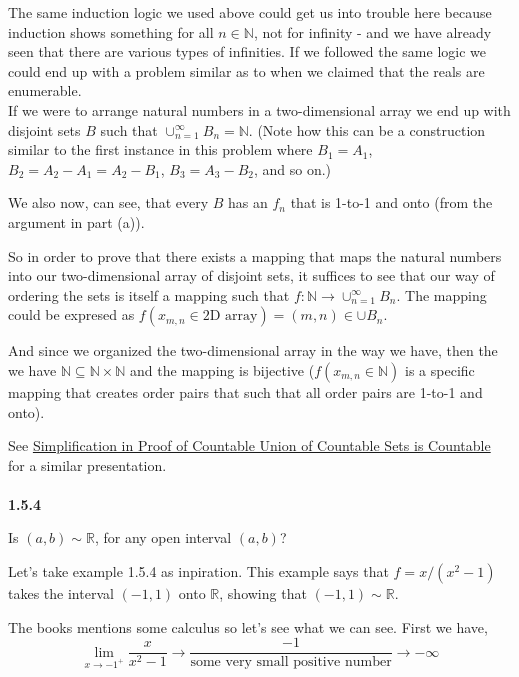 The same induction logic we used above could get us into trouble here because induction shows something
for all $n \in \mathbb{N}$, not for infinity - and we have already seen that there are various types of infinities.
If we followed the same logic we could end up with a problem similar as to when we claimed that the reals are
enumerable.
\\

If we were to arrange natural numbers in a two-dimensional array we end up with disjoint sets $B$ such that
$\cup^{\infty}_{n=1} B_n = \mathbb{N}$.
(Note how this can be a construction similar to the first instance in this problem where $B_1 = A_1$,
$B_2 = A_2-A_1 = A_2 - B_1$, $B_3 = A_3 - B_2$, and so on.)

We also now, can see, that every $B$ has an $f_n$ that is 1-to-1 and onto (from the argument in part (a)).

So in order to prove that there exists a mapping that maps the natural numbers into our two-dimensional array of disjoint sets,
it suffices to see that our way of ordering the sets is itself a mapping such that
$f : \mathbb{N} \rightarrow \cup^{\infty}_{n=1} B_n$.
The mapping could be expresed as $f (x_{m,n} \in \text{2D array}) = (m, n) \in \cup B_n$.

And since we organized the two-dimensional array in the way we have, then the we have
$\mathbb{N} \subseteq \mathbb{N} \times \mathbb{N}$ and the mapping is bijective
($f (x_{m,n} \in \mathbb{N})$ is a specific mapping that creates order pairs that such that all order pairs are 1-to-1 and onto).

See
\href{https://math.stackexchange.com/questions/4403048/simplification-in-proof-of-countable-union-of-countable-sets-is-countable}{Simplification in Proof of Countable Union of Countable Sets is Countable}
for a similar presentation.
\\~\\



\textbf{1.5.4}

Is $(a,b) \sim \mathbb{R}$, for any open interval $(a,b)$?

Let's take example 1.5.4 as inpiration.
This example says that $f = x / (x^2 -1)$ takes the interval $(-1, 1)$ onto $\mathbb{R}$, showing that
$(-1,1) \sim \mathbb{R}$.

The books mentions some calculus so let's see what we can see.
First we have,
$$
\lim_{x \rightarrow -1^+ } \frac{x}{x^2 - 1} \rightarrow
    \frac{-1}{\text{some very small positive number}} 
    \rightarrow -\infty
$$

